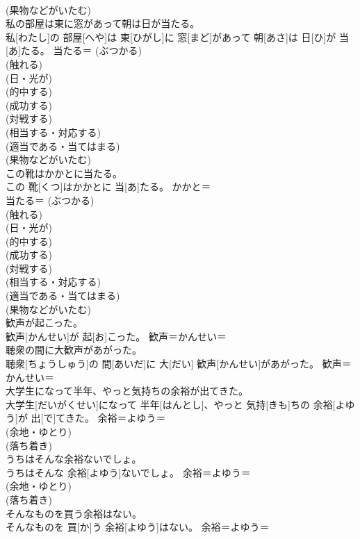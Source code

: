 \documentclass[8pt]{extreport}
\begin{document}
\begin{CJK}{UTF8}{min}
{\\	(果物などがいたむ)
\\	私の部屋は東に窓があって朝は日が当たる。	
\\	私[わたし]の 部屋[へや]は 東[ひがし]に 窓[まど]があって 朝[あさ]は 日[ひ]が 当[あ]たる。	当たる＝ (ぶつかる) 
\\	(触れる) 
\\	(日・光が) 
\\	(的中する) 
\\	(成功する) 
\\	(対戦する) 
\\	(相当する・対応する) 
\\	(適当である・当てはまる) 
\\	(果物などがいたむ)
\\	この靴はかかとに当たる。	
\\	この 靴[くつ]はかかとに 当[あ]たる。	かかと＝ 
\\	当たる＝ (ぶつかる) 
\\	(触れる) 
\\	(日・光が) 
\\	(的中する) 
\\	(成功する) 
\\	(対戦する) 
\\	(相当する・対応する) 
\\	(適当である・当てはまる) 
\\	(果物などがいたむ)
\\	歓声が起こった。	
\\	歓声[かんせい]が 起[お]こった。	歓声＝かんせい＝ 
\\	聴衆の間に大歓声があがった。	
\\	聴衆[ちょうしゅう]の 間[あいだ]に 大[だい] 歓声[かんせい]があがった。	歓声＝かんせい＝ 
\\	大学生になって半年、やっと気持ちの余裕が出てきた。	
\\	大学生[だいがくせい]になって 半年[はんとし]、やっと 気持[きも]ちの 余裕[よゆう]が 出[で]てきた。	余裕＝よゆう＝ 
\\	(余地・ゆとり) 
\\	(落ち着き) 
\\	うちはそんな余裕ないでしょ。	
\\	うちはそんな 余裕[よゆう]ないでしょ。	余裕＝よゆう＝ 
\\	(余地・ゆとり) 
\\	(落ち着き) 
\\	そんなものを買う余裕はない。	
\\	そんなものを 買[か]う 余裕[よゆう]はない。	余裕＝よゆう＝ 
}
\end{CJK}
\end{document}
